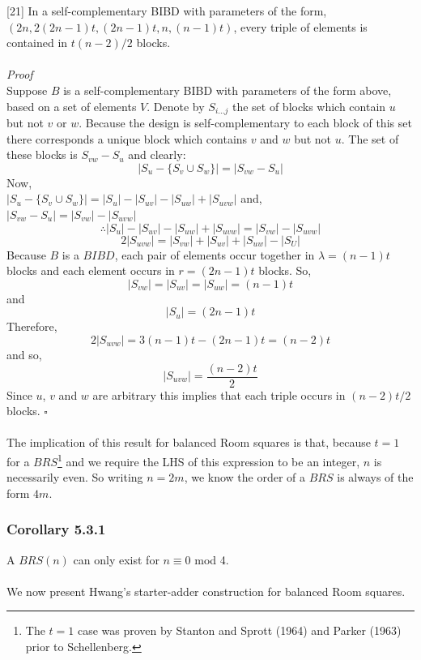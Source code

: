 \documentclass[
  12pt,
  a4paper]{book}
\begin{document}
{[}21{]} In a self-complementary BIBD with parameters of the form,\\
\((2n,2(2n-1)t,(2n-1)t,n,(n-1)t)\), every triple of elements is contained
in \(t(n-2)/2\) blocks.\\
~\\
\emph{Proof}\\
Suppose \(B\) is a self-complementary BIBD with parameters of the form
above, based on a set of elements \(V\). Denote by \(S_{i...j}\) the set of
blocks which contain \(u\) but not \(v\) or \(w\). Because the design is
self-complementary to each block of this set there corresponds a unique
block which contains \(v\) and \(w\) but not \(u\). The set of these blocks is
\(S_{vw}-S_u\) and clearly: \[|S_u - \{S_v \cup S_w\}| = |S_{vw} - S_u|\]
Now,\\
\(|S_u-\{S_v \cup S_w\}| = |S_u| - |S_{uv}| -|S_{uw}| + |S_{uvw}|\) and,\\
\(|S_{vw} - S_u| = |S_{vw}| - |S_{uvw}|\)
\[\therefore |S_u| - |S_{uv}| -|S_{uw}| + |S_{uvw}| = |S_{vw}| - |S_{uvw}|\]
\[2|S_{uvw}| = |S_{vw}| + |S_{uv}| + |S_{uw}| - |S_{U}|\] Because \(B\) is
a \(BIBD\), each pair of elements occur together in \(\lambda = (n-1)t\)
blocks and each element occurs in \(r=(2n-1)t\) blocks. So,
\[|S_{vw}| = |S_{uv}| = |S_{uw}| = (n-1)t\] and \[|S_u| = (2n-1)t\]
Therefore, \[2|S_{uvw}|=3(n-1)t-(2n-1)t=(n-2)t\] and so,
\[|S_{uvw}| = \frac{(n-2)t}{2}\] Since \(u\), \(v\) and \(w\) are arbitrary
this implies that each triple occurs in \((n-2)t/2\) blocks. \(\square\)\\
~\\
The implication of this result for balanced Room squares is that,
because \(t=1\) for a \(BRS\)\footnote{The \(t=1\) case was proven by Stanton and Sprott (1964) and Parker
  (1963) prior to Schellenberg.} and we require the LHS of this expression
to be an integer, \(n\) is necessarily even. So writing \(n=2m\), we know
the order of a \(BRS\) is always of the form \(4m\).

\hypertarget{corollary-5.3.1}{%
\subsubsection{Corollary 5.3.1}\label{corollary-5.3.1}}

A \(BRS(n)\) can only exist for \(n \equiv 0\) mod 4.\\
~\\
We now present Hwang's starter-adder construction for balanced Room
squares.
\end{document}

